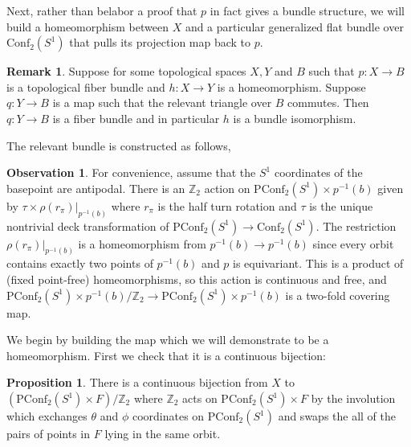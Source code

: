 \documentclass[10pt, oneside]{article}
\newcommand{\Z}{\mathbb{Z}}
\newcommand{\conf}[1]{\text{Conf}_{#1}(S^1)}
\newcommand{\pconf}[1]{\text{PConf}_{#1}(S^1)}
\theoremstyle{definition}
\newtheorem{rem}{Remark}[section]
\newtheorem*{obs*}{Observation}
\newtheorem{prop}{Proposition}[section]
\theoremstyle{definition}
\begin{document}
Next, rather than belabor a proof that $p$ in fact gives a bundle structure, we will build a homeomorphism between $X$ and a particular generalized flat bundle over $\conf{2}$ that pulls its projection map back to $p$. 

\begin{rem}
    Suppose for some topological spaces $X, Y$ and $B$ such that $p: X\to B$ is a topological fiber bundle and $h: X\to Y$ is a homeomorphism. Suppose $q: Y\to B$ is a map such that the relevant triangle over $B$ commutes. Then $q:Y \to B$ is a fiber bundle and in particular $h$ is a bundle isomorphism.
\end{rem}

The relevant bundle is constructed as follows,
\begin{obs*}
    For convenience, assume that the $S^1$ coordinates of the basepoint are antipodal. There is an $\Z_2$ action on $\pconf{2}\times p^{-1}(b)$ given by $\tau\times \rho(r_\pi)|_{p^{-1}(b)}$ where $r_\pi$ is the half turn rotation and $\tau$ is the unique nontrivial deck transformation of $\pconf{2}\to\conf{2}$. The restriction $\rho(r_\pi)|_{p^{-1}(b)}$ is a homeomorphism from $p^{-1}(b)\to p^{-1}(b)$ since every orbit contains exactly two points of $p^{-1}(b)$ and $p$ is equivariant. This is a product of (fixed point-free) homeomorphisms, so this action is continuous and free, and $\pconf{2}\times p^{-1}(b)/\Z_2\to \pconf{2}\times p^{-1}(b)$ is a two-fold covering map.
\end{obs*}

We begin by building the map which we will demonstrate to be a homeomorphism. First we check that it is a continuous bijection:

\begin{prop}
    There is a continuous bijection from $X$ to $(\pconf{2}\times F)/\Z_2$ where $\Z_2$ acts on $\pconf{2}\times F$ by the involution which exchanges $\theta$ and $\phi$ coordinates on $\pconf{2}$ and swaps the all of the pairs of points in $F$ lying in the same orbit.
\end{prop}
\end{document}

